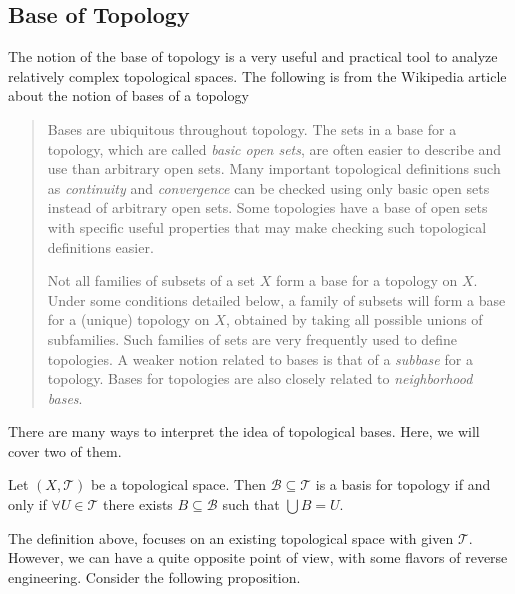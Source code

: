 \subsection{Base of Topology}
The notion of the base of topology is a very useful and practical tool to analyze relatively complex topological spaces. The following is from the Wikipedia article about the notion  of bases of a topology
\begin{quote}
	Bases are ubiquitous throughout topology. The sets in a base for a topology, which are called \emph{basic open sets}, are often easier to describe and use than arbitrary open sets. Many important topological definitions such as \emph{continuity} and \emph{convergence} can be checked using only basic open sets instead of arbitrary open sets. Some topologies have a base of open sets with specific useful properties that may make checking such topological definitions easier.
	
	Not all families of subsets of a set \( X \) form a base for a topology on \( X \). Under some conditions detailed below, a family of subsets will form a base for a (unique) topology on \( X \), obtained by taking all possible unions of subfamilies. Such families of sets are very frequently used to define topologies. A weaker notion related to bases is that of a \emph{subbase} for a topology. Bases for topologies are also closely related to \emph{neighborhood bases}.
\end{quote}

There are many ways to interpret the idea of topological bases. Here, we will cover two of them.
\begin{definition}
	Let $(X,\mathcal{T})$ be a topological space. Then $\mathcal{B} \subseteq \mathcal{T}$ is a basis for topology if and only if $\forall U \in \mathcal{T}$ there exists $B \subseteq \mathcal{B}$ such that $\bigcup B = U$. 
\end{definition}

The definition above, focuses on an existing topological space with given $\mathcal{T}$. However, we can have a quite opposite point of view, with some flavors of reverse engineering. Consider the following proposition.

